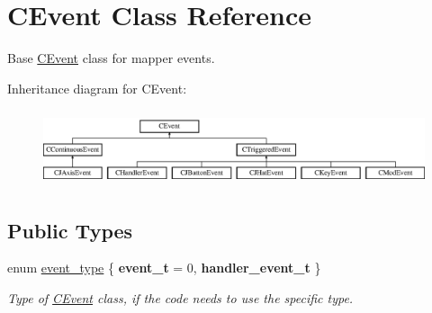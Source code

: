 \hypertarget{classCEvent}{\section{C\-Event Class Reference}
\label{classCEvent}
}


Base \hyperlink{classCEvent}{C\-Event} class for mapper events.  


Inheritance diagram for C\-Event\-:\begin{figure}[H]
\begin{center}
\leavevmode
\includegraphics[height=2.258065cm]{classCEvent}
\end{center}
\end{figure}
\subsection*{Public Types}
\begin{DoxyCompactItemize}
\item 
enum \hyperlink{classCEvent_a93a65775636793dfcabe38d14739c2bd}{event\-\_\-type} \{ {\bfseries event\-\_\-t} = 0, 
{\bfseries handler\-\_\-event\-\_\-t}
 \}
\begin{DoxyCompactList}\small\item\em Type of \hyperlink{classCEvent}{C\-Event} class, if the code needs to use the specific type. \end{DoxyCompactList}\end{DoxyCompactItemize}
